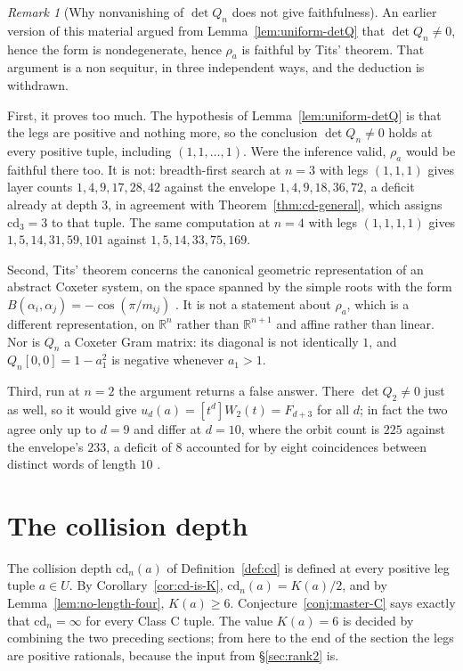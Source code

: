 \documentclass[11pt,a4paper]{article}
\newcommand{\R}{\mathbb{R}}
\newcommand{\cd}{\mathrm{cd}}
\theoremstyle{definition}
\theoremstyle{remark}
\newtheorem{remark}[theorem]{Remark}
\theoremstyle{plain}
\begin{document}
\begin{remark}[Why nonvanishing of $\det Q_n$ does not give faithfulness]\label{rem:detQ-nonsequitur}
An earlier version of this material argued from Lemma~\ref{lem:uniform-detQ} that
$\det Q_n\ne0$, hence the form is nondegenerate, hence $\rho_a$ is faithful by Tits' theorem.
That argument is a non sequitur, in three independent ways, and the deduction is withdrawn.

First, it proves too much. The hypothesis of Lemma~\ref{lem:uniform-detQ} is that the legs are
positive and nothing more, so the conclusion $\det Q_n\ne0$ holds at every positive tuple,
including $(1,1,\dots,1)$. Were the inference valid, $\rho_a$ would be faithful there too. It is
not: breadth-first search at $n=3$ with legs $(1,1,1)$ gives layer counts $1,4,9,17,28,42$
against the envelope $1,4,9,18,36,72$, a deficit already at depth $3$, in agreement with
Theorem~\ref{thm:cd-general}, which assigns $\cd_3=3$ to that tuple. The same computation at
$n=4$ with legs $(1,1,1,1)$ gives $1,5,14,31,59,101$ against $1,5,14,33,75,169$.

Second, Tits' theorem concerns the canonical geometric representation of an abstract Coxeter
system, on the space spanned by the simple roots with the form
$B(\alpha_i,\alpha_j)=-\cos(\pi/m_{ij})$ \cite{Bourbaki}. It is not a statement about $\rho_a$,
which is a different representation, on $\R^n$ rather than $\R^{n+1}$ and affine rather than
linear. Nor is $Q_n$ a Coxeter Gram matrix: its diagonal is not identically $1$, and
$Q_n[0,0]=1-a_1^2$ is negative whenever $a_1>1$.

Third, run at $n=2$ the argument returns a false answer. There $\det Q_2\ne0$ just as well, so it
would give $u_d(a)=[t^d]W_2(t)=F_{d+3}$ for all $d$; in fact the two agree only up to $d=9$ and
differ at $d=10$, where the orbit count is $225$ against the envelope's $233$, a deficit of $8$
accounted for by eight coincidences between distinct words of length $10$ \cite{Bonfioli1}.
\end{remark}

\section{The collision depth}\label{sec:cd}

The collision depth $\cd_n(a)$ of Definition~\ref{def:cd} is defined at every positive leg
tuple $a\in U$. By Corollary~\ref{cor:cd-is-K}, $\cd_n(a)=K(a)/2$, and by
Lemma~\ref{lem:no-length-four}, $K(a)\ge6$. Conjecture~\ref{conj:master-C} says exactly that
$\cd_n=\infty$ for every Class C tuple. The value $K(a)=6$ is decided by combining the two
preceding sections; from here to the end of the section the legs are positive rationals,
because the input from \S\ref{sec:rank2} is.
\end{document}
